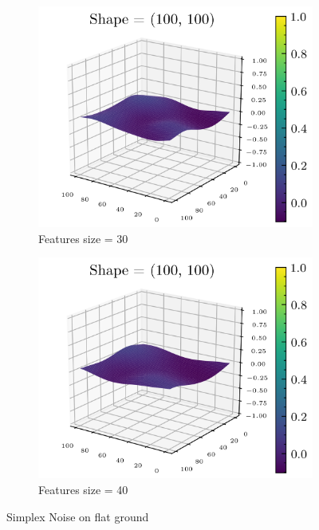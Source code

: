 \documentclass[../document.tex]{subfiles}
\begin{document}
\begin{figure}[H]
          \begin{subfigure}[b]{0.45\textwidth}
            \includegraphics[width=\textwidth]{../img/data-aug/3d/simplex3.png}
            \caption{Features size = 30}
        \end{subfigure}    
        \begin{subfigure}[b]{0.45\textwidth}
            \includegraphics[width=\textwidth]{../img/data-aug/3d/simplex4.png}
            \caption{Features size = 40}
        \end{subfigure}    
    \label{fig: simplex-noise}
    \caption{Simplex Noise on flat ground}    
\end{figure}
\end{document}
